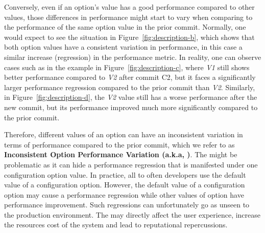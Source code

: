 Conversely, even if an option's value has a good performance compared to other values, those differences in performance might start to vary %
when comparing to the performance of the same option value in the prior commit. Normally, one would expect to see the situation in Figure~\ref{fig:description-b}, which shows that both option values have a consistent variation in performance, in this case a similar increase (regression) in the performance metric. In reality, one can observe %
cases such as in the example in Figure~\ref{fig:description-c}, where \emph{V1} still shows better performance compared to \emph{V2} after commit C2, but it faces a significantly larger performance regression compared to the prior commit than \emph{V2}. Similarly, in Figure~\ref{fig:description-d}, the \emph{V2} value still has a worse performance after the new commit, but its performance improved much more significantly compared to the prior commit.

Therefore, different values of an option can have an inconsistent variation in terms of performance compared to the prior commit, which %
we refer to as \textbf{Inconsistent Option Performance Variation (a.k.a, \inconsistent)}. The \inconsistent might be problematic as it can hide a performance regression that is manifested under one configuration option value. In practice, all to often developers use the default value of a configuration option. However, the default value of a configuration option may cause a performance regression while other values of option have performance improvement. %
Such regressions can unfortunately go as unseen to the production environment. The \inconsistent may directly affect the user experience, increase the resources cost of the system and lead to reputational repercussions. 

